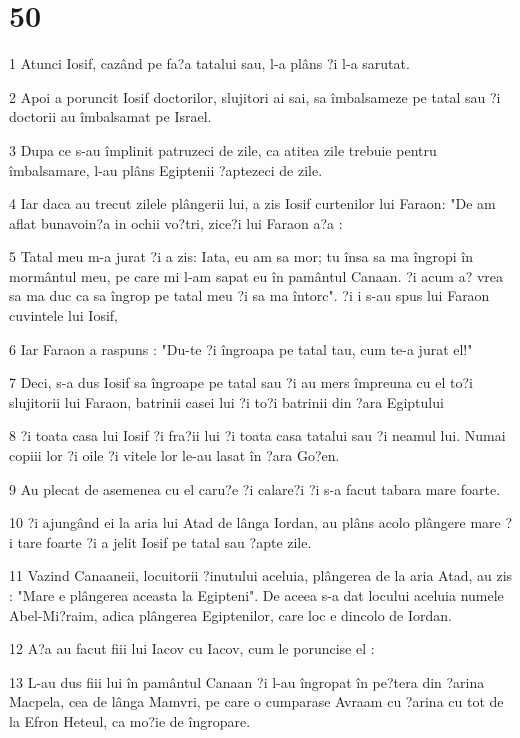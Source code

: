 \chapter{50}

\par 1 Atunci Iosif, cazând pe fa?a tatalui sau, l-a plâns ?i l-a sarutat.
\par 2 Apoi a poruncit Iosif doctorilor, slujitori ai sai, sa îmbalsameze pe tatal sau ?i doctorii au îmbalsamat pe Israel.
\par 3 Dupa ce s-au împlinit patruzeci de zile, ca atitea zile trebuie pentru îmbalsamare, l-au plâns Egiptenii ?aptezeci de zile.
\par 4 Iar daca au trecut zilele plângerii lui, a zis Iosif curtenilor lui Faraon: "De am aflat bunavoin?a in ochii vo?tri, zice?i lui Faraon a?a :
\par 5 Tatal meu m-a jurat ?i a zis: Iata, eu am sa mor; tu însa sa ma îngropi în mormântul meu, pe care mi l-am sapat eu în pamântul Canaan. ?i acum a? vrea sa ma duc ca sa îngrop pe tatal meu ?i sa ma întorc". ?i i s-au spus lui Faraon cuvintele lui Iosif,
\par 6 Iar Faraon a raspuns : "Du-te ?i îngroapa pe tatal tau, cum te-a jurat el!"
\par 7 Deci, s-a dus Iosif sa îngroape pe tatal sau ?i au mers împreuna cu el to?i slujitorii lui Faraon, batrinii casei lui ?i to?i batrinii din ?ara Egiptului
\par 8 ?i toata casa lui Iosif ?i fra?ii lui ?i toata casa tatalui sau ?i neamul lui. Numai copiii lor ?i oile ?i vitele lor le-au lasat în ?ara Go?en.
\par 9 Au plecat de asemenea cu el caru?e ?i calare?i ?i s-a facut tabara mare foarte.
\par 10 ?i ajungând ei la aria lui Atad de lânga Iordan, au plâns acolo plângere mare ?i tare foarte ?i a jelit Iosif pe tatal sau ?apte zile.
\par 11 Vazind Canaaneii, locuitorii ?inutului aceluia, plângerea de la aria Atad, au zis : "Mare e plângerea aceasta la Egipteni". De aceea s-a dat locului aceluia numele Abel-Mi?raim, adica plângerea Egiptenilor, care loc e dincolo de Iordan.
\par 12 A?a au facut fiii lui Iacov cu Iacov, cum le poruncise el :
\par 13 L-au dus fiii lui în pamântul Canaan ?i l-au îngropat în pe?tera din ?arina Macpela, cea de lânga Mamvri, pe care o cumparase Avraam cu ?arina cu tot de la Efron Heteul, ca mo?ie de îngropare.
